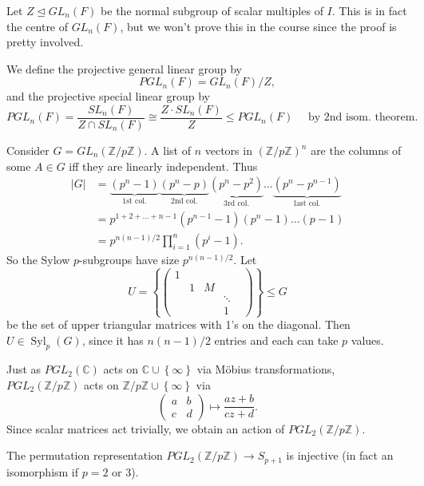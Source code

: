 \documentclass[egregdoesnotlikesansseriftitles,a4paper]{scrartcl}
\begin{document}
Let $Z \unlhd GL_{n}(F)$ be the normal subgroup of scalar multiples of $I$. This is in fact the centre of $GL_{n}(F)$, but we won't prove this in the course since the proof is pretty involved.
\begin{definition*}
      We define the projective general linear group by \[
      PGL_{n}(F)=GL_{n}(F)/Z
      ,\] and the projective special linear group by \[
          PGL_{n}(F)= \frac{SL_{n}(F)}{Z \cap SL_{n}(F)} \cong \frac{Z \cdot  SL_{n}(F)}{Z} \leq PGL_{n}(F) \quad \text{ by 2nd isom. theorem}
      .\] 
\end{definition*}
\begin{example*}
     Consider $G=GL_{n}(\mathbb{Z}/p\mathbb{Z})$. A list of $n$ vectors in $(\mathbb{Z}/p\mathbb{Z})^{n}$ are the columns of some $A \in G$ iff they are linearly independent. Thus 
     \begin{align*}
          |G|&= \underbrace{(p^{n}-1)}_{\text{1st col.} }\underbrace{(p^{n}-p)}_{\text{2nd col.} } \underbrace{(p^{n}-p^2)}_{\text{3rd col.} } \ldots \underbrace{(p^{n}-p^{n-1})}_{\text{last col.} } \\
          &=p^{1+2+\ldots +n-1} (p^{n-1}-1)(p^{n}-1)\ldots (p-1)\\
          &=p^{n (n-1)/2} \prod_{i=1}^n (p^{i}-1).
     \end{align*}
     So the Sylow $p$-subgroups have size $p^{n (n-1)/2}$. Let \[
     U=\left\{\begin{pmatrix} 1&&&\\ &1&M& \\&&&\ddots & \\ &&&1 \end{pmatrix}\right\} \leq G
     \] be the set of upper triangular matrices with 1's on the diagonal. Then $U \in \operatorname{Syl}_{p}(G)$, since it has $n (n-1)/2$ entries and each can take $p$ values.
\end{example*}
Just as $PGL_{2}(\mathbb{C})$ acts on $\mathbb{C} \cup \left\{ \infty\right\}$ via Möbius transformations, $PGL_{2}(\mathbb{Z}/p\mathbb{Z})$ acts on $\mathbb{Z}/p\mathbb{Z} \cup \left\{ \infty\right\}$ via \[
\begin{pmatrix} a&b\\c&d  \end{pmatrix}\mapsto  \frac{az+b}{cz+d}
.\] Since scalar matrices act trivially, we obtain an action of $PGL_{2}(\mathbb{Z}/p\mathbb{Z})$.
\begin{lemma}\label{permrep}
      The permutation representation $PGL_{2}(\mathbb{Z}/p\mathbb{Z}) \rightarrow S_{p+1}$ is injective (in fact an isomorphism if $p=2$ or $3$).
\end{lemma}
\end{document}
